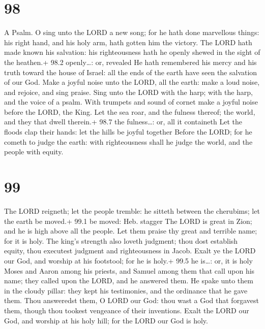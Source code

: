 \hypertarget{section-97}{%
\section{98}\label{section-97}}

A Psalm.  O sing unto the LORD a new song; for he hath done
marvellous things: his right hand, and his holy arm, hath gotten him the
victory.  The LORD hath made known his salvation: his
righteousness hath he openly shewed in the sight of the heathen.+ 98.2
openly\ldots: or, revealed  He hath remembered his mercy and
his truth toward the house of Israel: all the ends of the earth have
seen the salvation of our God.  Make a joyful noise unto the
LORD, all the earth: make a loud noise, and rejoice, and sing praise.
 Sing unto the LORD with the harp; with the harp, and the
voice of a psalm.  With trumpets and sound of cornet make a
joyful noise before the LORD, the King.  Let the sea roar,
and the fulness thereof; the world, and they that dwell therein.+ 98.7
the fulness\ldots: or, all it containeth  Let the floods
clap their hands: let the hills be joyful together  Before
the LORD; for he cometh to judge the earth: with righteousness shall he
judge the world, and the people with equity.

\hypertarget{section-98}{%
\section{99}\label{section-98}}

 The LORD reigneth; let the people tremble: he sitteth
between the cherubims; let the earth be moved.+ 99.1 be moved: Heb.
stagger  The LORD is great in Zion; and he is high above all
the people.  Let them praise thy great and terrible name;
for it is holy.  The king's strength also loveth judgment;
thou dost establish equity, thou executest judgment and righteousness in
Jacob.  Exalt ye the LORD our God, and worship at his
footstool; for he is holy.+ 99.5 he is\ldots: or, it is holy
 Moses and Aaron among his priests, and Samuel among them
that call upon his name; they called upon the LORD, and he answered
them.  He spake unto them in the cloudy pillar: they kept
his testimonies, and the ordinance that he gave them.  Thou
answeredst them, O LORD our God: thou wast a God that forgavest them,
though thou tookest vengeance of their inventions.  Exalt
the LORD our God, and worship at his holy hill; for the LORD our God is
holy.

